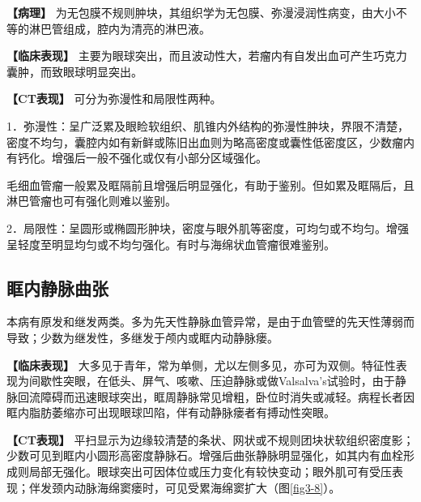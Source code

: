 \textbf{【病理】}
为无包膜不规则肿块，其组织学为无包膜、弥漫浸润性病变，由大小不等的淋巴管组成，腔内为清亮的淋巴液。

\textbf{【临床表现】}
主要为眼球突出，而且波动性大，若瘤内有自发出血可产生巧克力囊肿，而致眼球明显突出。

\textbf{【CT表现】} 可分为弥漫性和局限性两种。

1．弥漫性：呈广泛累及眼睑软组织、肌锥内外结构的弥漫性肿块，界限不清楚，密度不均匀，囊腔内如有新鲜或陈旧出血则为略高密度或囊性低密度区，少数瘤内有钙化。增强后一般不强化或仅有小部分区域强化。

毛细血管瘤一般累及眶隔前且增强后明显强化，有助于鉴别。但如累及眶隔后，且淋巴管瘤也可有强化则难以鉴别。

2．局限性：呈圆形或椭圆形肿块，密度与眼外肌等密度，可均匀或不均匀。增强呈轻度至明显均匀或不均匀强化。有时与海绵状血管瘤很难鉴别。

\subsection{眶内静脉曲张}

本病有原发和继发两类。多为先天性静脉血管异常，是由于血管壁的先天性薄弱而导致；少数为继发性，多继发于颅内或眶内动静脉瘘。

\textbf{【临床表现】}
大多见于青年，常为单侧，尤以左侧多见，亦可为双侧。特征性表现为间歇性突眼，在低头、屏气、咳嗽、压迫静脉或做Valsalva's试验时，由于静脉回流障碍而迅速眼球突出，眶周静脉常见增粗，卧位时消失或减轻。病程长者因眶内脂肪萎缩亦可出现眼球凹陷，伴有动静脉瘘者有搏动性突眼。

\textbf{【CT表现】}
平扫显示为边缘较清楚的条状、网状或不规则团块状软组织密度影；少数可见到眶内小圆形高密度静脉石。增强后曲张静脉明显强化，如其内有血栓形成则局部无强化。眼球突出可因体位或压力变化有较快变动；眼外肌可有受压表现；伴发颈内动脉海绵窦瘘时，可见受累海绵窦扩大（图\ref{fig3-8}）。

